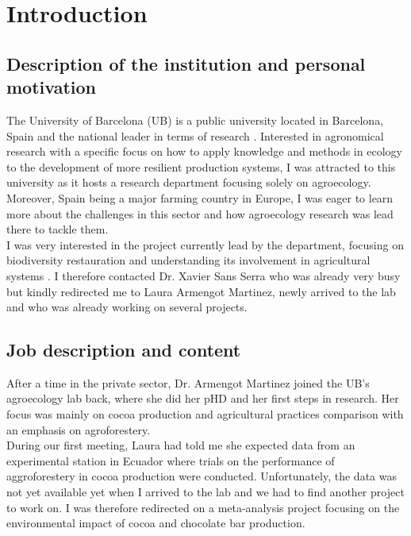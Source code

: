 \documentclass{article}
\begin{document}
\newpage
\tableofcontents
\newpage


\section{Introduction} \label{sec:intro}
\subsection{Description of the institution and personal motivation}
The University of Barcelona (UB) is a public university located in Barcelona,
Spain
and the national leader in terms of research \cite{UBwebsite1}. Interested in
agronomical research with a specific focus on how to apply knowledge and
methods in ecology to the development of more resilient production systems, I
was attracted to this university as it hosts a research department focusing
solely on agroecology. Moreover, Spain being a major farming country in Europe,
I was eager to learn more about the challenges in this sector and how
agroecology research was lead there to tackle them.\\
I was very interested in the project currently lead by the department, focusing
on biodiversity restauration and understanding its involvement in agricultural
systems \cite{UBwebsite2}. I therefore contacted Dr. Xavier Sans Serra who was
already very busy but kindly redirected me to Laura Armengot Martinez, newly
arrived to the lab and who was already working on several projects.

\subsection{Job description and content}
After a time in the private sector, Dr. Armengot Martinez joined the UB's
agroecology lab back, where she did her pHD and her first steps in research.
Her focus was mainly on cocoa production and agricultural practices comparison
with an emphasis on agroforestery.\\
During our first meeting, Laura had told me she expected data from an
experimental station in Ecuador where trials on the performance of
aggroforestery in cocoa production were conducted. Unfortunately, the data was not yet
available yet when I arrived to the lab and we had to find another project to work
on. I was therefore redirected on a meta-analysis project focusing on the
environmental impact of cocoa and chocolate bar production.\\
\end{document}
